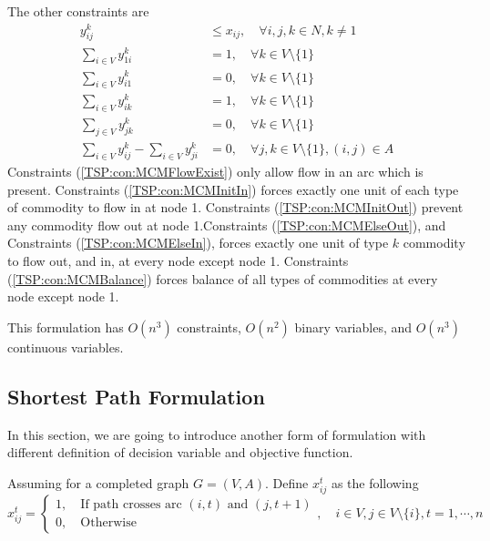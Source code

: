 					The other constraints are
					\begin{align}
						y_{ij}^k &\le x_{ij}, \quad \forall i, j, k \in N, k \neq 1 \label{TSP:con:MCMFlowExist}\\
						\sum_{i \in V} y_{1i}^k &= 1, \quad \forall k \in V \setminus \{1\} \label{TSP:con:MCMInitIn}\\
						\sum_{i \in V} y_{i1}^k &= 0, \quad \forall k \in V \setminus \{1\} \label{TSP:con:MCMInitOut}\\
						\sum_{i \in V} y_{ik}^k &= 1, \quad \forall k \in V \setminus \{1\} \label{TSP:con:MCMElseOut}\\
						\sum_{j \in V} y_{jk}^k &= 0, \quad \forall k \in V \setminus \{1\} \label{TSP:con:MCMElseIn}\\
						\sum_{i \in V} y_{ij}^k - \sum_{i \in V} y_{ji}^k &= 0, \quad \forall j, k \in V \setminus \{1\}, (i, j) \in A \label{TSP:con:MCMBalance}
					\end{align}
					Constraints (\ref{TSP:con:MCMFlowExist}) only allow flow in an arc which is present. Constraints (\ref{TSP:con:MCMInitIn}) forces exactly one unit of each type of commodity to flow in at node 1. Constraints (\ref{TSP:con:MCMInitOut}) prevent any commodity flow out at node 1.Constraints (\ref{TSP:con:MCMElseOut}), and Constraints (\ref{TSP:con:MCMElseIn}), forces exactly one unit of type $k$ commodity to flow out, and in, at every node except node 1. Constraints (\ref{TSP:con:MCMBalance}) forces balance of all types of commodities at every node except node 1.

					This formulation has $O(n^3)$ constraints, $O(n^2)$ binary variables, and $O(n^3)$ continuous variables.

				\subsection{Shortest Path Formulation}

					In this section, we are going to introduce another form of formulation with different definition of decision variable and objective function.

					Assuming for a completed graph $G = (V, A)$. Define $x_{ij}^t$ as the following
					\begin{equation}
						x_{ij}^t = \begin{cases}
										1, \quad \text{If path crosses arc } (i, t) \text{ and } (j, t + 1) \\
										0, \quad \text{Otherwise}
									\end{cases}, \quad i \in V, j \in V \setminus \{i\}, t = 1, \cdots, n
					\end{equation}

